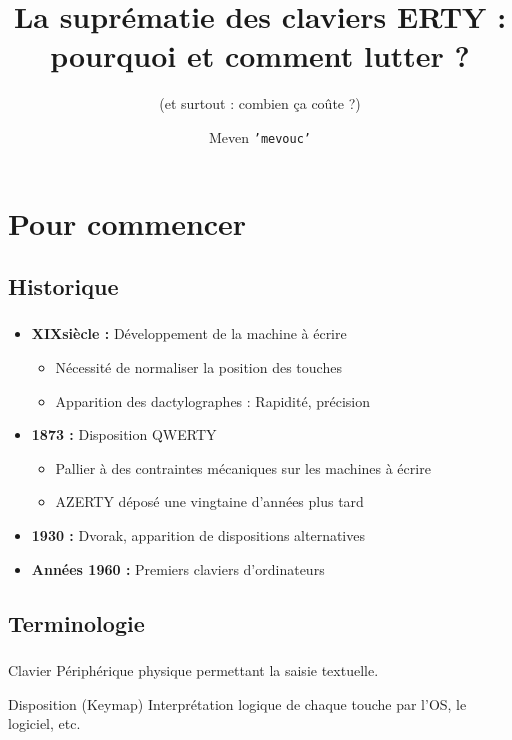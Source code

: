 \documentclass[c,12pt]{beamer}
\title{La suprématie des claviers ERTY : pourquoi et comment lutter ?}
\subtitle{(et surtout : combien ça coûte ?)}
\author{Meven \texttt{'mevouc'} \bsc{Courouble}}
\date{\oldstylenums{3 décembre 2015}}
\begin{document}
\frame{\titlepage}

\section{Pour commencer}
\subsection{Historique}

\begin{frame}
	\frametitle{\subsecname}
	\begin{itemize}
		\item<1-> \textbf{XIX\ieme siècle :} Développement de la machine à écrire
			\begin{itemize}
				\item<2-> Nécessité de normaliser la position des touches
				\item<3-> Apparition des dactylographes : Rapidité, précision
			\end{itemize}
		\item<4-> \textbf{1873 :} Disposition QWERTY
			\begin{itemize}
				\item<5-> Pallier à des contraintes mécaniques sur les machines à écrire
				\item<6-> AZERTY déposé une vingtaine d'années plus tard
			\end{itemize}
		\item<7-> \textbf{1930 :} Dvorak, apparition de dispositions alternatives
		\item \textbf{Années 1960 :} Premiers claviers d'ordinateurs
	\end{itemize}
\end{frame}

\subsection{Terminologie}

\begin{frame}
	\frametitle{\subsecname}
	\begin{block}{Clavier}
		Périphérique physique permettant la saisie textuelle.
	\end{block}
	\begin{block}{Disposition (Keymap)}
		Interprétation logique de chaque touche par l'OS, le logiciel, etc.
	\end{block}
\end{frame}
\end{document}
